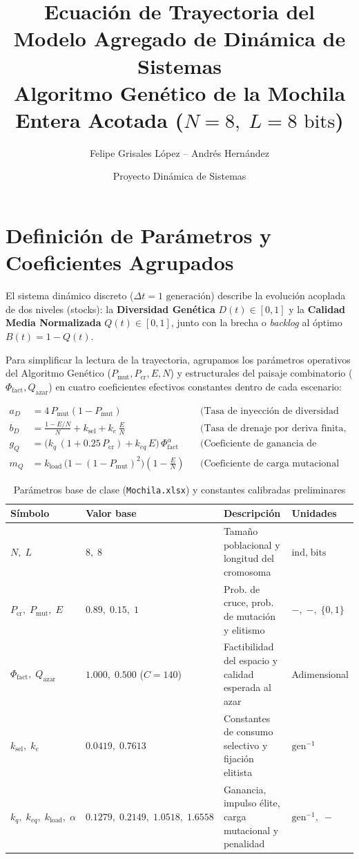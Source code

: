 \documentclass[11pt,letterpaper]{article}
\title{\textbf{Ecuación de Trayectoria del Modelo Agregado de Dinámica de Sistemas}\\
\large Algoritmo Genético de la Mochila Entera Acotada ($N = 8,\; L = 8\text{ bits}$)}
\author{Felipe Grisales López \quad -- \quad Andrés Hernández}
\date{Proyecto Dinámica de Sistemas}
\begin{document}
\maketitle

\section{Definición de Parámetros y Coeficientes Agrupados}

El sistema dinámico discreto ($\Delta t = 1\text{ generación}$) describe la evolución acoplada de dos niveles (stocks): la \textbf{Diversidad Genética} $D(t) \in [0, 1]$ y la \textbf{Calidad Media Normalizada} $Q(t) \in [0, 1]$, junto con la brecha o \textit{backlog} al óptimo $B(t) = 1 - Q(t)$.

Para simplificar la lectura de la trayectoria, agrupamos los parámetros operativos del Algoritmo Genético ($P_{\text{mut}}, P_{\text{cr}}, E, N$) y estructurales del paisaje combinatorio ($\Phi_{\text{fact}}, Q_{\text{azar}}$) en cuatro coeficientes efectivos constantes dentro de cada escenario:

\begin{align}
a_D &= 4\,P_{\text{mut}}(1 - P_{\text{mut}}) && \text{(Tasa de inyección de diversidad por mutación)} \\[4pt]
b_D &= \frac{1 - E/N}{N} + k_{\text{sel}} + k_e\,\frac{E}{N} && \text{(Tasa de drenaje por deriva finita, selección y elitismo)} \\[4pt]
g_Q &= \Big(k_q\,(1 + 0.25\,P_{\text{cr}}) + k_{eq}\,E\Big)\,\Phi_{\text{fact}}^{\alpha} && \text{(Coeficiente de ganancia de aptitud efectiva)} \\[4pt]
m_Q &= k_{\text{load}}\,\big(1 - (1 - P_{\text{mut}})^2\big)\left(1 - \frac{E}{N}\right) && \text{(Coeficiente de carga mutacional sobre no élite)}
\end{align}

\begin{table}[h]
\centering
\caption{Parámetros base de clase (\texttt{Mochila.xlsx}) y constantes calibradas preliminares}
\begin{tabular}{@{}llll@{}}
\toprule
\textbf{Símbolo} & \textbf{Valor base} & \textbf{Descripción} & \textbf{Unidades} \\ \midrule
$N,\; L$ & $8,\; 8$ & Tamaño poblacional y longitud del cromosoma & $\text{ind},\; \text{bits}$ \\
$P_{\text{cr}},\; P_{\text{mut}},\; E$ & $0.89,\; 0.15,\; 1$ & Prob. de cruce, prob. de mutación y elitismo & $-,\; -,\; \{0,1\}$ \\
$\Phi_{\text{fact}},\; Q_{\text{azar}}$ & $1.000,\; 0.500$ ($C=140$) & Factibilidad del espacio y calidad esperada al azar & Adimensional \\
$k_{\text{sel}},\; k_e$ & $0.0419,\; 0.7613$ & Constantes de consumo selectivo y fijación elitista & $\text{gen}^{-1}$ \\
$k_q,\; k_{eq},\; k_{\text{load}},\; \alpha$ & $0.1279,\; 0.2149,\; 1.0518,\; 1.6558$ & Ganancia, impulso élite, carga mutacional y penalidad & $\text{gen}^{-1},\; -$ \\
\bottomrule
\end{tabular}
\end{table}
\end{document}
